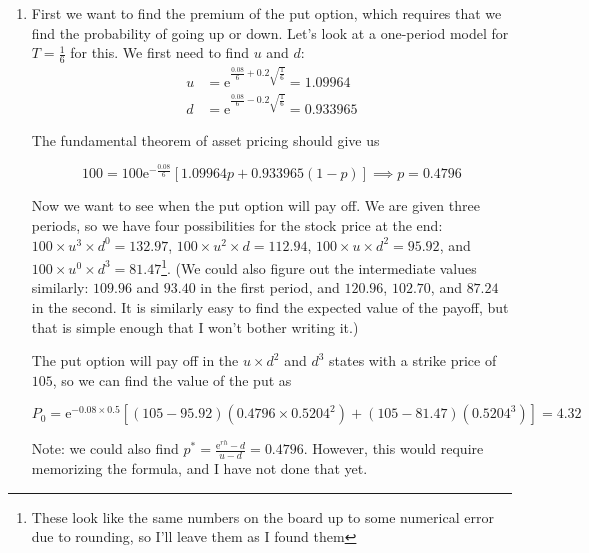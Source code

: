 \documentclass[12pt, letterpaper]{article}
\newcommand{\e}{\mathrm{e}}
\begin{document}
    \begin{enumerate}
    \item First we want to find the premium of the put option, which requires that we find the probability of going up or down. Let's look at a one-period model for \(T = \frac{1}{6}\) for this. We first need to find \(u\) and \(d\):
    \begin{align*}
    u &= \e^{\frac{0.08}{6} + 0.2 \sqrt{\frac{1}{6}}} = 1.09964 \\
    d &= \e^{\frac{0.08}{6} - 0.2 \sqrt{\frac{1}{6}}} = 0.933965
    \end{align*}
    
    The fundamental theorem of asset pricing should give us 
    
    \[ 100 = 100 \e^{-\frac{0.08}{6}} \left[ 1.09964 p + 0.933965 (1 - p) \right] \implies p = 0.4796   \]

    Now we want to see when the put option will pay off. We are given three periods, so we have four possibilities for the stock price at the end: \(100 \times u^3 \times d^0 = 132.97\), \(100 \times u^2 \times d = 112.94\), \(100 \times u \times d^2 = 95.92\), and \(100 \times u^0 \times d^3 = 81.47\)\footnote{These look like the same numbers on the board up to some numerical error due to rounding, so I'll leave them as I found them}. (We could also figure out the intermediate values similarly: \(109.96\) and \(93.40\) in the first period, and \(120.96\), \(102.70\), and \(87.24\) in the second. It is similarly easy to find the expected value of the payoff, but that is simple enough that I won't bother writing it.)

    The put option will pay off in the \(u \times d^2\) and \(d^3\) states with a strike price of \(105\), so we can find the value of the put as

    \[ P_0 = \e^{-0.08 \times 0.5} \left[ (105 - 95.92) \left(0.4796 \times 0.5204^2\right) + (105 - 81.47) \left( 0.5204^3 \right) \right] = 4.32      \]

    Note: we could also find \(p^* = \frac{\e^{rh} - d}{u - d} = 0.4796\). However, this would require memorizing the formula, and I have not done that yet.

    \end{enumerate}
\end{document}
